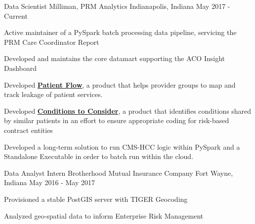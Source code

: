

\begin{cventries}

  \cventry
    {Data Scientist} %
    {Milliman, PRM Analytics} %
    {Indianapolis, Indiana} %
    {May 2017 - Current} %
    {
      \begin{cvitems} %
        \item {Active maintainer of a PySpark batch processing data pipeline, servicing the PRM Care Coordinator Report}
        \item {Developed and maintains the core datamart supporting the ACO Insight Dashboard}
        \item {Developed \href{http://www.medinsight.milliman.com/uploadedFiles/MedInsight_Site/About/MedInsight-Patient-Flow.pdf}{\textbf{Patient Flow}}, a product that helps provider groups to map and track leakage of patient services.}
	\item {Developed \href{http://assets.milliman.com/ektron/medinsight-machine-learning-conditions-consider.pdf}{\textbf{Conditions to Consider}}, a product that identifies conditions shared by similar patients in an effort to ensure appropriate coding for risk-based contract entities}
	\item {Developed a long-term solution to run CMS-HCC logic within PySpark and a Standalone Executable in order to batch run within the cloud.}
      \end{cvitems}
    }

  \cventry
    {Data Analyst Intern} %
    {Brotherhood Mutual Insurance Company} %
    {Fort Wayne, Indiana} %
    {May 2016 - May 2017} %
    {
      \begin{cvitems} %
        \item {Provisioned a stable PostGIS server with TIGER Geocoding}
        \item {Analyzed geo-spatial data to inform Enterprise Risk Management}
      \end{cvitems}
    }


\end{cventries}
